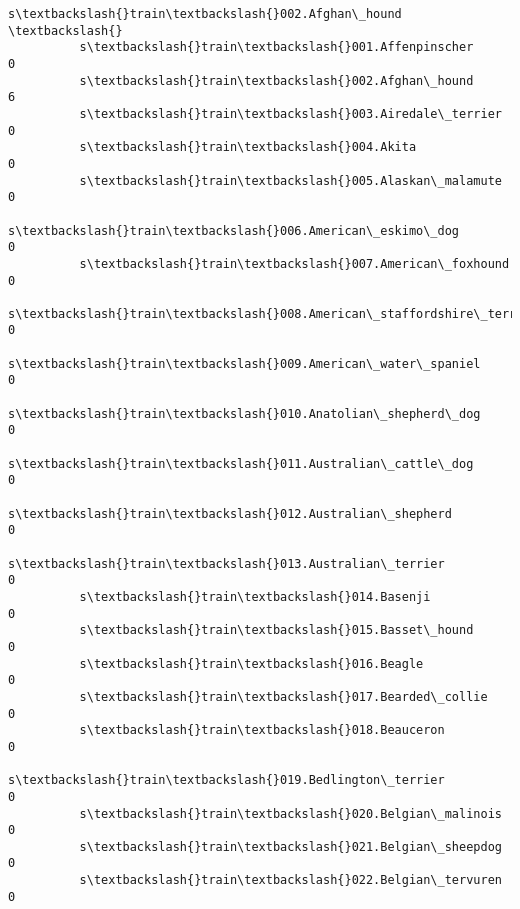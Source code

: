 \documentclass[11pt]{article}
\begin{document}
\begin{Verbatim}[commandchars=\\\{\}]
                                                          s\textbackslash{}train\textbackslash{}002.Afghan\_hound  \textbackslash{}
          s\textbackslash{}train\textbackslash{}001.Affenpinscher                                              0   
          s\textbackslash{}train\textbackslash{}002.Afghan\_hound                                               6   
          s\textbackslash{}train\textbackslash{}003.Airedale\_terrier                                           0   
          s\textbackslash{}train\textbackslash{}004.Akita                                                      0   
          s\textbackslash{}train\textbackslash{}005.Alaskan\_malamute                                           0   
          s\textbackslash{}train\textbackslash{}006.American\_eskimo\_dog                                        0   
          s\textbackslash{}train\textbackslash{}007.American\_foxhound                                          0   
          s\textbackslash{}train\textbackslash{}008.American\_staffordshire\_terrier                             0   
          s\textbackslash{}train\textbackslash{}009.American\_water\_spaniel                                     0   
          s\textbackslash{}train\textbackslash{}010.Anatolian\_shepherd\_dog                                     0   
          s\textbackslash{}train\textbackslash{}011.Australian\_cattle\_dog                                      0   
          s\textbackslash{}train\textbackslash{}012.Australian\_shepherd                                        0   
          s\textbackslash{}train\textbackslash{}013.Australian\_terrier                                         0   
          s\textbackslash{}train\textbackslash{}014.Basenji                                                    0   
          s\textbackslash{}train\textbackslash{}015.Basset\_hound                                               0   
          s\textbackslash{}train\textbackslash{}016.Beagle                                                     0   
          s\textbackslash{}train\textbackslash{}017.Bearded\_collie                                             0   
          s\textbackslash{}train\textbackslash{}018.Beauceron                                                  0   
          s\textbackslash{}train\textbackslash{}019.Bedlington\_terrier                                         0   
          s\textbackslash{}train\textbackslash{}020.Belgian\_malinois                                           0   
          s\textbackslash{}train\textbackslash{}021.Belgian\_sheepdog                                           0   
          s\textbackslash{}train\textbackslash{}022.Belgian\_tervuren                                           0   

\end{Verbatim}
\end{document}

